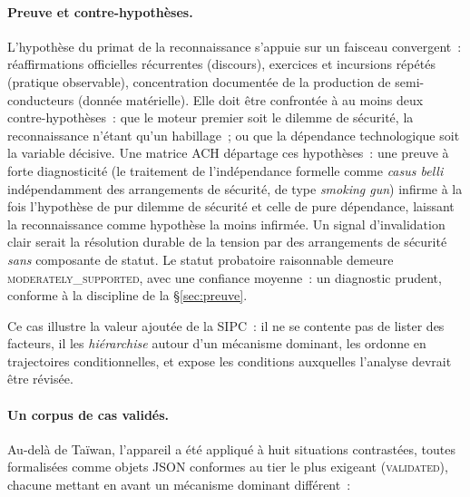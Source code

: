 \documentclass[11pt,a4paper]{article}
\begin{document}
\paragraph{Preuve et contre-hypothèses.} L'hypothèse du primat de la reconnaissance s'appuie sur
un faisceau convergent~: réaffirmations officielles récurrentes (discours), exercices et
incursions répétés (pratique observable), concentration documentée de la production de
semi-conducteurs (donnée matérielle). Elle doit être confrontée à au moins deux
contre-hypothèses~: que le moteur premier soit le dilemme de sécurité, la reconnaissance n'étant
qu'un habillage~; ou que la dépendance technologique soit la variable décisive. Une matrice ACH
départage ces hypothèses~: une preuve à forte diagnosticité (le traitement de l'indépendance
formelle comme \emph{casus belli} indépendamment des arrangements de sécurité, de type
\emph{smoking gun}) infirme à la fois l'hypothèse de pur dilemme de sécurité et celle de pure
dépendance, laissant la reconnaissance comme hypothèse la moins infirmée. Un signal
d'invalidation clair serait la résolution durable de la tension par des arrangements de sécurité
\emph{sans} composante de statut. Le statut probatoire raisonnable demeure
\textsc{moderately\_supported}, avec une confiance moyenne~: un diagnostic prudent, conforme à la
discipline de la \S\ref{sec:preuve}.

Ce cas illustre la valeur ajoutée de la SIPC~: il ne se contente pas de lister des facteurs, il
les \emph{hiérarchise} autour d'un mécanisme dominant, les ordonne en trajectoires
conditionnelles, et expose les conditions auxquelles l'analyse devrait être révisée.

\paragraph{Un corpus de cas validés.} Au-delà de Taïwan, l'appareil a été appliqué à huit
situations contrastées, toutes formalisées comme objets JSON conformes au tier le plus exigeant
(\textsc{validated}), chacune mettant en avant un mécanisme dominant différent~:
\end{document}

